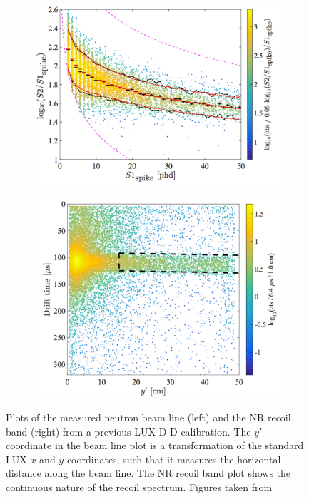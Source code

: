 \begin{figure}[h!]
\centering
\begin{subfigure}{0.5\textwidth}
  \centering
  \includegraphics[width=\textwidth]{Figures/DDband.pdf}
\end{subfigure}%
\begin{subfigure}{0.5\textwidth}
  \centering
  \includegraphics[width=\textwidth]{Figures/DDbeam.pdf}
\end{subfigure}
\caption{Plots of the measured neutron beam line (left) and the NR recoil band (right) from a previous LUX D-D calibration. The $y'$ coordinate in the beam line plot is a transformation of the standard LUX $x$ and $y$ coordinates, such that it measures the horizontal distance along the beam line. The NR recoil band plot shows the continuous nature of the recoil spectrum. Figures taken from \cite{lux_dd2} }
\label{fig:ddplot}
\end{figure}

